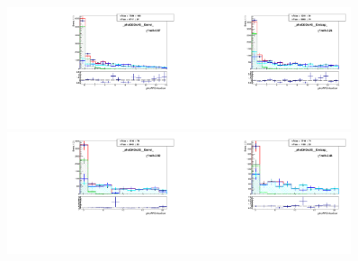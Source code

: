 \begin{figure}[htb]
  \begin{center}
   \includegraphics[width=0.45\textwidth]{../figs/figs_v11/MUON_WGamma/TemplateFits/c_TEMPL_CHISO_UNblind__phoEt35to45__Barrel__RooFit_MCclosure.pdf}\includegraphics[width=0.45\textwidth]{../figs/figs_v11/MUON_WGamma/TemplateFits/c_TEMPL_CHISO_UNblind__phoEt35to45__Endcap__RooFit_MCclosure.pdf}\\
   \includegraphics[width=0.45\textwidth]{../figs/figs_v11/MUON_WGamma/TemplateFits/c_TEMPL_CHISO_UNblind__phoEt45to55__Barrel__RooFit_MCclosure.pdf}\includegraphics[width=0.45\textwidth]{../figs/figs_v11/MUON_WGamma/TemplateFits/c_TEMPL_CHISO_UNblind__phoEt45to55__Endcap__RooFit_MCclosure.pdf}\\

\end{center}
\end{figure}
